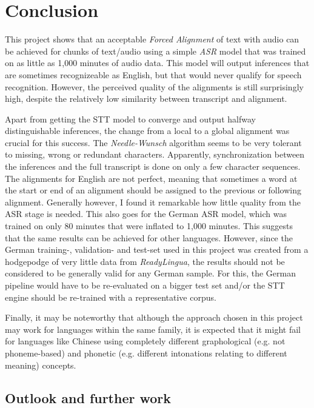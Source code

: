 \section{Conclusion}\label{conclusion}

This project shows that an acceptable \textit{Forced Alignment} of text with audio can be achieved for chunks of text/audio using a simple \textit{ASR} model that was trained on as little as 1,000 minutes of audio data. This model will output inferences that are sometimes recognizeable as English, but that would never qualify for speech recognition. However, the perceived quality of the alignments is still surprisingly high, despite the relatively low similarity between transcript and alignment. 

Apart from getting the \ac{STT} model to converge and output halfway distinguishable inferences, the change from a local to a global alignment was crucial for this success. The \textit{Needle-Wunsch} algorithm seems to be very tolerant to missing, wrong or redundant characters. Apparently, synchronization between the inferences and the full transcript is done on only a few character sequences. The alignments for English are not perfect, meaning that sometimes a word at the start or end of an alignment should be assigned to the previous or following alignment. Generally however, I found it remarkable how little quality from the \ac{ASR} stage is needed. This also goes for the German \ac{ASR} model, which was trained on only 80 minutes that were inflated to 1,000 minutes. This suggests that the same results can be achieved for other languages. However, since the German training-, validation- and test-set used in this project was created from a hodgepodge of very little data from \textit{ReadyLingua}, the results should not be considered to be generally valid for any German sample. For this, the German pipeline would have to be re-evaluated on a bigger test set and/or the \ac{STT} engine should be re-trained with a representative corpus.

Finally, it may be noteworthy that although the approach chosen in this project may work for languages within the same family, it is expected that it might fail for languages like Chinese using completely different graphological (e.g. not phoneme-based) and phonetic (e.g. different intonations relating to different meaning) concepts.

\subsection{Outlook and further work}

